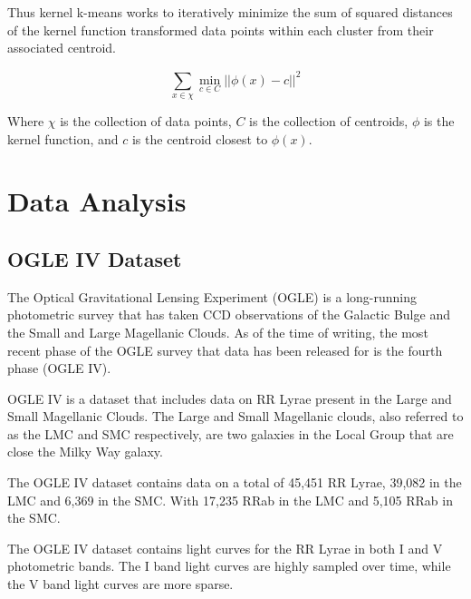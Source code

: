 \documentclass[]{article}
\begin{document}
Thus kernel k-means works to iteratively minimize the sum of squared distances of the kernel function transformed data points within each cluster from their associated centroid.

$$
\sum_{x \in \chi}^{}\min_{c \in C} || \phi(x) - c ||^2
$$

Where $\chi$ is the collection of data points, $C$ is the collection of centroids, $\phi$ is the kernel function, and $c$ is the centroid closest to $\phi(x)$.


\newpage

\section{Data Analysis}


\subsection{OGLE IV Dataset}

The Optical Gravitational Lensing Experiment (OGLE) is a long-running photometric survey that has taken CCD observations of the Galactic Bulge and the Small and Large Magellanic Clouds. \cite{udalski_1992, soszynski_2016} As of the time of writing, the most recent phase of the OGLE survey that data has been released for is the fourth phase (OGLE IV). \cite{soszynski_2016}

OGLE IV is a dataset that includes data on RR Lyrae present in the Large and Small Magellanic Clouds. The Large and Small Magellanic clouds, also referred to as the LMC and SMC respectively, are two galaxies in the Local Group that are close the Milky Way galaxy. \cite{harvard_2007}

The OGLE IV dataset contains data on a total of 45,451 RR Lyrae, 39,082 in the LMC and 6,369 in the SMC. With 17,235 RRab in the LMC and 5,105 RRab in the SMC. \cite{soszynski_2016}

The OGLE IV dataset contains light curves for the RR Lyrae in both I and V photometric bands. The I band light curves are highly sampled over time, while the V band light curves are more sparse. \cite{soszynski_2016}
\end{document}

